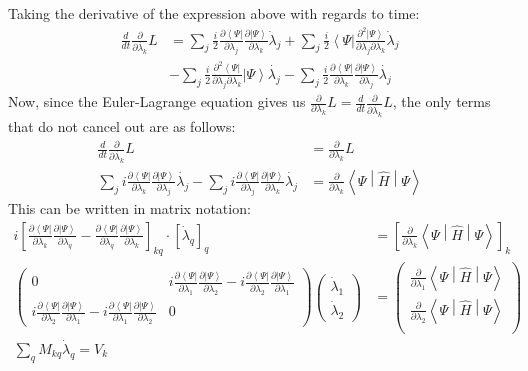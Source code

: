 \documentclass{aux/ttuthes2007}
\newcommand{\bra}[1]{\ensuremath{\left\langle#1\right\vert}}
\newcommand{\ket}[1]{\ensuremath{\left|#1\right\rangle}}
\newcommand{\sandwich}[3]{\left< #1 \middle\vert #2 \middle\vert #3 \right>}
\newcommand{\ddt}{\frac{d}{dt}}
\newcommand{\pd}[1]{\frac{\partial}{\partial #1}}
\newcommand{\kpp}[1]{\frac{\partial \ket\Psi}{\partial #1}}
\newcommand{\bpp}[1]{\frac{\partial \bra\Psi}{\partial #1}}
\newcommand{\kppd}[2]{\frac{\partial^{2} \ket\Psi}{\partial #1 \partial #2}}
\newcommand{\bppd}[2]{\frac{\partial^{2} \bra\Psi}{\partial #1 \partial #2}}
\begin{document}
%
Taking the derivative of the expression above with regards to time:
%
\begin{equation*}
	\begin{split}
		\ddt \pd{\dot{\lambda_k}} L &=
		\sum_j \frac{i}{2}\bpp{\lambda_j}{\kpp {\lambda_k}} \dot \lambda_j
	+	\sum_j \frac{i}{2}\bra{\Psi}{\kppd {\lambda_j}{\lambda_k}} \dot \lambda_j \\
    	&- 	\sum_j \frac{i}{2}{\bppd{\lambda_j}{\lambda_k}}\ket{\Psi}\dot{\lambda_j}
	- 	\sum_j \frac{i}{2}{\bpp{\lambda_k}}\kpp{\lambda_j}\dot{\lambda_j}
	\end{split}
\end{equation*}
%
Now, since the Euler-Lagrange equation gives us $\pd{\lambda_k} L = \ddt \pd{\dot {\lambda_k}} L$, the only terms that do not cancel out are as follows:
%
\begin{equation*}
	\begin{split}
		\ddt \pd{\dot{\lambda_k}} L 
	&=	\pd{\lambda_k} L
	\\
	 	\sum_j i \bpp{\lambda_k} \kpp{\lambda_j}\dot{\lambda_j}
	-	\sum_j i \bpp{\lambda_j} \kpp{\lambda_k}\dot{\lambda_j}
	&= 	\pd{\lambda_k}\sandwich{\Psi}{\hat H}{\Psi}
	\end{split}
\end{equation*}
%
This can be written in matrix notation:
%
\begin{equation*}
	\begin{split}
	 	i \left [ \bpp{\lambda_k} \kpp{\lambda_q} 
			- \bpp{\lambda_q} \kpp{\lambda_k} \right ]_{kq}
		\cdot \left[ \dot \lambda_q \right]_q
	&= 	\left[\pd{\lambda_k}\sandwich{\Psi}{\hat H}{\Psi}\right]_k \\
	\begin{pmatrix}
		0 & i \bpp{\lambda_1} \kpp{\lambda_2} - i \bpp{\lambda_2} \kpp{\lambda_1} \\
		i \bpp{\lambda_2} \kpp{\lambda_1} - i \bpp{\lambda_1} \kpp{\lambda_2} & 0
	\end{pmatrix} 
	\begin{pmatrix}
		\dot \lambda_1 \\
		\dot \lambda_2 
	\end{pmatrix} 
	    &=
	\begin{pmatrix}
		\pd {\lambda_1} \sandwich{\Psi}{\hat H}{\Psi}\\
		\pd {\lambda_2} \sandwich{\Psi}{\hat H}{\Psi}\\
	\end{pmatrix} \\
	\sum_q M_{kq} \dot \lambda_q = V_k
	\end{split}
\end{equation*}
\end{document}
